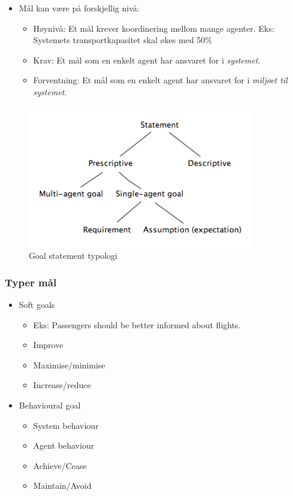 \begin{itemize}
\item
  Mål kan være på forskjellig nivå:
  \begin{itemize}
  \item
    Høynivå: Et mål krever koordinering mellom mange agenter. Eks:
    Systemets transportkapasitet skal økes med 50\%
  \item
    Krav: Et mål som en enkelt agent har ansvaret for i \emph{systemet}.
  \item
    Forventning: Et mål som en enkelt agent har ansvaret for i
    \emph{miljøet til systemet}.
  \end{itemize}
\end{itemize}
\begin{figure}[htbp]
\centering
\includegraphics{Forelesning 02/img/2.png}
\caption{Goal statement typologi}
\end{figure}

\subsubsection{Typer mål}

\begin{itemize}
\item
  Soft goals
  \begin{itemize}
  \item
    Eks: Passengers should be better informed about flights.
  \item
    Improve
  \item
    Maximise/minimise
  \item
    Increase/reduce
  \end{itemize}
\item
  Behavioural goal
  \begin{itemize}
  \item
    System behaviour
  \item
    Agent behaviour
  \item
    Achieve/Cease
  \item
    Maintain/Avoid
  \end{itemize}
\end{itemize}
